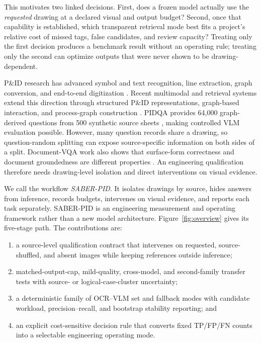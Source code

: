\documentclass[11pt]{article}
\begin{document}
This motivates two linked decisions. First, does a frozen model actually use
the \emph{requested} drawing at a declared visual and output budget? Second,
once that capability is established, which transparent retrieval mode best
fits a project's relative cost of missed tags, false candidates, and review
capacity? Treating only the first decision produces a benchmark result without
an operating rule; treating only the second can optimize outputs that were
never shown to be drawing-dependent.

P\&ID research has advanced symbol and text recognition, line extraction,
graph conversion, and end-to-end digitization
\cite{rahul2019,paliwal2021,kim2021,su2024}. Recent multimodal and retrieval
systems extend this direction through structured P\&ID representations,
graph-based interaction, and process-graph construction
\cite{alimin2025,alimin2026,zhu2026}. PIDQA provides 64,000 graph-derived
questions from 500 synthetic source sheets \cite{gupta2025}, making controlled
VLM evaluation possible. However, many question records share a drawing, so
question-random splitting can expose source-specific information on both sides
of a split. Document-VQA work also shows that surface-form correctness and
document groundedness are different properties
\cite{mathew2021,nourbakhsh2025}. An engineering qualification therefore needs
drawing-level isolation and direct interventions on visual evidence.

We call the workflow \emph{SABER-PID}. It isolates drawings by source, hides
answers from inference, records budgets, intervenes on visual evidence, and
reports each task separately. SABER-PID is an engineering measurement and
operating framework rather than a new model architecture.
Figure~\ref{fig:overview} gives its five-stage path. The contributions are:

\begin{enumerate}[leftmargin=1.5em,itemsep=2pt]
\item a source-level qualification contract that intervenes on requested,
source-shuffled, and absent images while keeping references outside inference;
\item matched-output-cap, mild-quality, cross-model, and second-family transfer
tests with source- or logical-case-cluster uncertainty;
\item a deterministic family of OCR--VLM set and fallback modes with candidate
workload, precision--recall, and bootstrap stability reporting; and
\item an explicit cost-sensitive decision rule that converts fixed TP/FP/FN
counts into a selectable engineering operating mode.
\end{enumerate}
\end{document}
